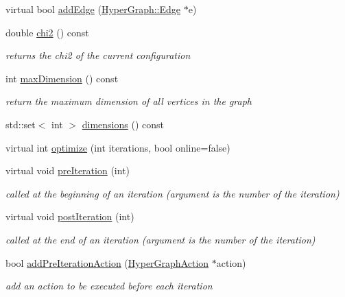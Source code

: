 \begin{DoxyCompactItemize}
\item 
virtual bool \hyperlink{structg2o_1_1OptimizableGraph_a6831ed69fce3dba691f53302a2813070}{add\+Edge} (\hyperlink{classg2o_1_1HyperGraph_1_1Edge}{Hyper\+Graph\+::\+Edge} $\ast$e)
\item 
double \hyperlink{structg2o_1_1OptimizableGraph_afa9378225b271351f4425bd266f76d3a}{chi2} () const 
\begin{DoxyCompactList}\small\item\em returns the chi2 of the current configuration \end{DoxyCompactList}\item 
int \hyperlink{structg2o_1_1OptimizableGraph_abb25500d3f73dae8f2325ae11991c46f}{max\+Dimension} () const 
\begin{DoxyCompactList}\small\item\em return the maximum dimension of all vertices in the graph \end{DoxyCompactList}\item 
std\+::set$<$ int $>$ \hyperlink{structg2o_1_1OptimizableGraph_a186d6d06a59395488cd15d25bf112ad9}{dimensions} () const 
\item 
virtual int \hyperlink{structg2o_1_1OptimizableGraph_ac1b2e36c05680dd3e60ed6f90dddf5d8}{optimize} (int iterations, bool online=false)
\item 
virtual void \hyperlink{structg2o_1_1OptimizableGraph_ad295e7f06651db627b8ebde3d8898bab}{pre\+Iteration} (int)
\begin{DoxyCompactList}\small\item\em called at the beginning of an iteration (argument is the number of the iteration) \end{DoxyCompactList}\item 
virtual void \hyperlink{structg2o_1_1OptimizableGraph_ac8d41dc0830f1ae07e9cb4a8341d3ffb}{post\+Iteration} (int)
\begin{DoxyCompactList}\small\item\em called at the end of an iteration (argument is the number of the iteration) \end{DoxyCompactList}\item 
bool \hyperlink{structg2o_1_1OptimizableGraph_a2ab7899a0ff7bc29177e9447a10d508c}{add\+Pre\+Iteration\+Action} (\hyperlink{classg2o_1_1HyperGraphAction}{Hyper\+Graph\+Action} $\ast$action)
\begin{DoxyCompactList}\small\item\em add an action to be executed before each iteration \end{DoxyCompactList}\item 

\end{DoxyCompactItemize}
